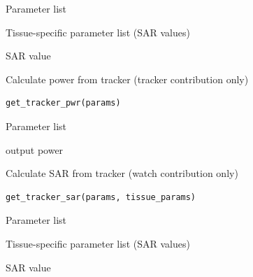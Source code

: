 \documentclass[a4paper]{book}
\begin{document}
%
\begin{Arguments}
\begin{ldescription}
\item[\code{params}] Parameter list

\item[\code{tissue\_params}] Tissue-specific parameter list (SAR values)
\end{ldescription}
\end{Arguments}
%
\begin{Value}
SAR value
\end{Value}
%
\begin{Description}
Calculate power from tracker (tracker contribution only)
\end{Description}
%
\begin{Usage}
\begin{verbatim}
get_tracker_pwr(params)
\end{verbatim}
\end{Usage}
%
\begin{Arguments}
\begin{ldescription}
\item[\code{params}] Parameter list
\end{ldescription}
\end{Arguments}
%
\begin{Value}
output power
\end{Value}
%
\begin{Description}
Calculate SAR from tracker (watch contribution only)
\end{Description}
%
\begin{Usage}
\begin{verbatim}
get_tracker_sar(params, tissue_params)
\end{verbatim}
\end{Usage}
%
\begin{Arguments}
\begin{ldescription}
\item[\code{params}] Parameter list

\item[\code{tissue\_params}] Tissue-specific parameter list (SAR values)
\end{ldescription}
\end{Arguments}
%
\begin{Value}
SAR value
\end{Value}
\end{document}
